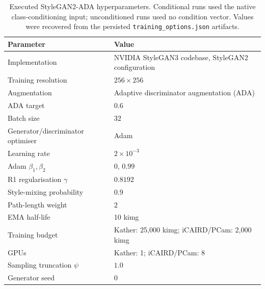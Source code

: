 
\begin{table}[htbp]
\centering
\small
\setlength{\tabcolsep}{5pt}
\begin{tabular}{ll}
\toprule
Parameter & Value \\
\midrule
Implementation & NVIDIA StyleGAN3 codebase, StyleGAN2 configuration \\
Training resolution & $256\times256$ \\
Augmentation & Adaptive discriminator augmentation (ADA) \\
ADA target & $0.6$ \\
Batch size & 32 \\
Generator/discriminator optimiser & Adam \\
Learning rate & $2\times10^{-3}$ \\
Adam $\beta_1,\beta_2$ & $0,\,0.99$ \\
R1 regularisation $\gamma$ & $0.8192$ \\
Style-mixing probability & $0.9$ \\
Path-length weight & $2$ \\
EMA half-life & 10 kimg \\
Training budget & Kather: 25,000 kimg; iCAIRD/PCam: 2,000 kimg \\
GPUs & Kather: 1; iCAIRD/PCam: 8 \\
Sampling truncation $\psi$ & $1.0$ \\
Generator seed & 0 \\
\bottomrule
\end{tabular}
\caption{Executed StyleGAN2-ADA hyperparameters. Conditional runs used
the native class-conditioning input; unconditioned runs used no condition
vector. Values were recovered from the persisted
\texttt{training\_options.json} artifacts.}
\label{tab:stylegan2ada-hyperparameters}
\end{table}

